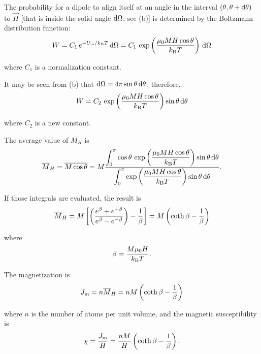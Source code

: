 The probability for a dipole to align itself at an angle in the interval $(\theta, \theta+\mathrm{d}\theta)$ to $\vec{H}$ [that is inside the solid angle $\mathrm{d}\Omega$; see (b)] is determined by the Boltzmann distribution function:
\begin{equation*}
    W = C_1\, e^{-U_{\text{m}}/k_{\text{B}}T}\, \mathrm{d}\Omega = C_1\, \exp\left(\frac{\mu_0 M H \cos\theta}{k_{\text{B}}T}\right)\, \mathrm{d}\Omega
\end{equation*}

\noindent
where $C_1$ is a normalization constant.

It may be seen from (b) that $\mathrm{d}\Omega=4\pi\sin\theta\,\mathrm{d}\theta$; therefore,
\begin{equation*}
    W = C_2\, \exp\left(\frac{\mu_0 M H \cos\theta}{k_{\text{B}}T}\right) \sin\theta\, \mathrm{d}\theta
\end{equation*}

\noindent
where $C_2$ is a new constant.

The average value of $M_H$ is
\begin{equation}\label{eq:7_46}
    \overline{M}_H = \overline{M\cos\theta} = M \frac{\displaystyle\int_0^\pi \cos\theta\,\exp\left(\dfrac{\mu_0 M H \cos\theta}{k_{\text{B}}T}\right) \sin\theta\, \mathrm{d}\theta}{\displaystyle\int_0^\pi \exp\left(\dfrac{\mu_0 M H \cos\theta}{k_{\text{B}}T}\right) \sin\theta\, \mathrm{d}\theta}.
\end{equation}

\noindent
If those integrals are evaluated, the result is
\begin{equation}\label{eq:7_47}
    \overline{M}_H = M \left[\left( \frac{e^{\beta}+e^{-\beta}}{e^{\beta}-e^{-\beta}}\right) - \frac{1}{\beta}\right] = M \left(\coth\beta - \frac{1}{\beta}\right)
\end{equation}

\noindent
where
\begin{equation}\label{eq:7_48}
    \beta = \frac{M \mu_0 H}{k_{\text{B}}T}.
\end{equation}

The magnetization is
\begin{equation}\label{eq:7_49}
    J_{\text{m}} = n \overline{M}_H = n M \left(\coth\beta - \frac{1}{\beta}\right)
\end{equation}

\noindent
where $n$ is the number of atoms per unit volume, and the magnetic susceptibility is
\begin{equation}\label{eq:7_50}
    \chi = \frac{J_{\text{m}}}{H} = \frac{n M}{H}\left(\coth\beta - \frac{1}{\beta}\right).
\end{equation}

